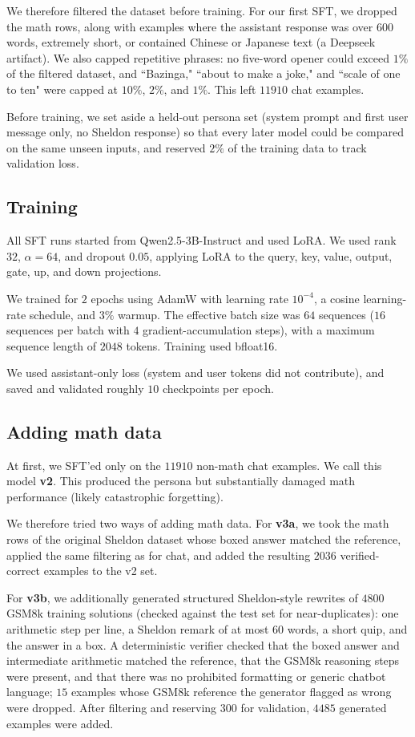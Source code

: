\documentclass[9pt]{extarticle}
\begin{document}
We therefore filtered the dataset before training. For our first SFT, we dropped the math rows, along with examples where the assistant response was over $600$ words, extremely short, or contained Chinese or Japanese text (a Deepseek artifact). We also capped repetitive phrases: no five-word opener could exceed $1\%$ of the filtered dataset, and ``Bazinga," ``about to make a joke," and ``scale of one to ten" were capped at $10\%$, $2\%$, and $1\%$. This left $11910$ chat examples.

Before training, we set aside a held-out persona set (system prompt and first user message only, no Sheldon response) so that every later model could be compared on the same unseen inputs, and reserved $2\%$ of the training data to track validation loss.

\subsection{Training}

All SFT runs started from Qwen2.5-3B-Instruct and used LoRA. We used rank $32$, $\alpha=64$, and dropout $0.05$, applying LoRA to the query, key, value, output, gate, up, and down projections.

We trained for $2$ epochs using AdamW with learning rate $10^{-4}$, a cosine learning-rate schedule, and $3\%$ warmup. The effective batch size was $64$ sequences ($16$ sequences per batch with $4$ gradient-accumulation steps), with a maximum sequence length of $2048$ tokens. Training used bfloat16.

We used assistant-only loss (system and user tokens did not contribute), and saved and validated roughly $10$ checkpoints per epoch.

\subsection{Adding math data}

At first, we SFT'ed only on the $11910$ non-math chat examples. We call this model \textbf{v2}. This produced the persona but substantially damaged math performance (likely catastrophic forgetting).

We therefore tried two ways of adding math data. For \textbf{v3a}, we took the math rows of the original Sheldon dataset whose boxed answer matched the reference, applied the same filtering as for chat, and added the resulting $2036$ verified-correct examples to the v2 set.

For \textbf{v3b}, we additionally generated structured Sheldon-style rewrites of $4800$ GSM8k training solutions (checked against the test set for near-duplicates): one arithmetic step per line, a Sheldon remark of at most $60$ words, a short quip, and the answer in a box. A deterministic verifier checked that the boxed answer and intermediate arithmetic matched the reference, that the GSM8k reasoning steps were present, and that there was no prohibited formatting or generic chatbot language; $15$ examples whose GSM8k reference the generator flagged as wrong were dropped. After filtering and reserving $300$ for validation, $4485$ generated examples were added.
\end{document}

